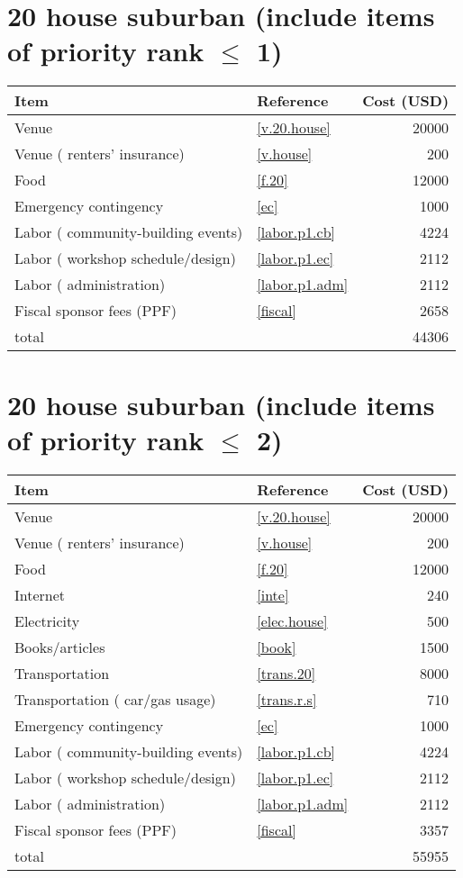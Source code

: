 \section*{20 house suburban (include items of priority rank $\leq$ 1)}
\begin{center}
\begin{tabular}{llr}
Item & Reference & Cost (USD) \\ \hline
Venue & \ref{v.20.house} & 20000 \\
Venue ( renters' insurance) & \ref{v.house} & 200 \\
Food & \ref{f.20} & 12000 \\
Emergency contingency & \ref{ec} & 1000 \\
Labor ( community-building events) & \ref{labor.p1.cb} & 4224 \\
Labor ( workshop schedule/design) & \ref{labor.p1.ec} & 2112 \\
Labor ( administration) & \ref{labor.p1.adm} & 2112 \\
Fiscal sponsor fees (PPF) & \ref{fiscal} & 2658 \\ \hline
total &  & 44306
\end{tabular}
\end{center}
\newpage
\section*{20 house suburban (include items of priority rank $\leq$ 2)}
\begin{center}
\begin{tabular}{llr}
Item & Reference & Cost (USD) \\ \hline
Venue & \ref{v.20.house} & 20000 \\
Venue ( renters' insurance) & \ref{v.house} & 200 \\
Food & \ref{f.20} & 12000 \\
Internet & \ref{inte} & 240 \\
Electricity & \ref{elec.house} & 500 \\
Books/articles & \ref{book} & 1500 \\
Transportation & \ref{trans.20} & 8000 \\
Transportation ( car/gas usage) & \ref{trans.r.s} & 710 \\
Emergency contingency & \ref{ec} & 1000 \\
Labor ( community-building events) & \ref{labor.p1.cb} & 4224 \\
Labor ( workshop schedule/design) & \ref{labor.p1.ec} & 2112 \\
Labor ( administration) & \ref{labor.p1.adm} & 2112 \\
Fiscal sponsor fees (PPF) & \ref{fiscal} & 3357 \\ \hline
total &  & 55955
\end{tabular}
\end{center}
\newpage
